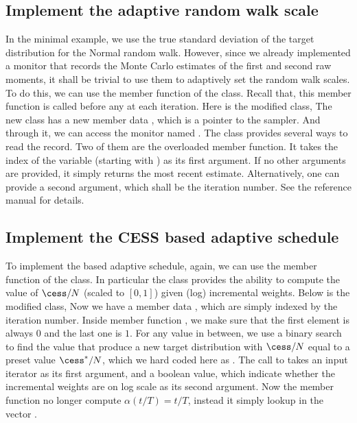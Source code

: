 \subsection{Implement the adaptive random walk scale}
\label{sub:Implement the adaptive random walk scale}

In the minimal example, we use the true standard deviation of the target
distribution for the Normal random walk. However, since we already implemented
a monitor that records the Monte Carlo estimates of the first and second raw
moments, it shall be trivial to use them to adaptively set the random walk
scales. To do this, we can use the  member function of the
 class. Recall that, this member function is called before any
 at each iteration. Here is the modified 
class,
The new class has a new member data , which is a pointer to the
sampler. And through it, we can access the monitor named . The
 class provides several ways to read the record. Two of them are
the overloaded  member function. It takes the index of the
variable (starting with ) as its first argument. If no other arguments
are provided, it simply returns the most recent estimate. Alternatively, one
can provide a second argument, which shall be the iteration number. See the
reference manual for details.

\subsection{Implement the CESS based adaptive schedule}
\label{sub:Implement the CESS based adaptive schedule}

To implement the \cess based adaptive schedule, again, we can use the member
function  of the  class. In particular the
 class provides the ability to compute the value of $\cess/N$
(scaled to $[0,1]$) given (log) incremental weights. Below is the modified
 class,
Now we have a member data , which are simply indexed by the
iteration number. Inside member function , we make sure
that the first element is always $0$ and the last one is $1$. For any value in
between, we use a binary search to find the value that produce a new target
distribution with $\cess/N$ equal to a preset value $\cess^*/N$, which we hard
coded here as . The call to  takes an
input iterator as its first argument, and a boolean value, which indicate
whether the incremental weights are on log scale as its second argument. Now
the  member function no longer compute $\alpha(t/T) = t/T$,
instead it simply lookup in the vector .

